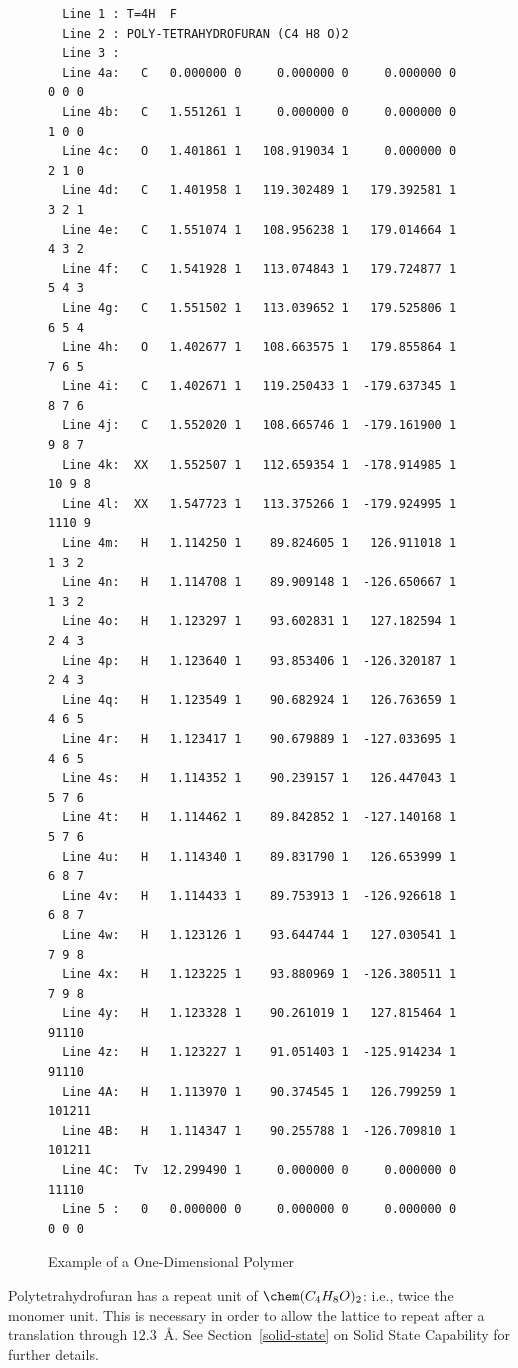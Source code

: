 \begin{figure}
\begin{makeimage}
\end{makeimage}
\compresstable
\begin{verbatim}
  Line 1 : T=4H  F
  Line 2 : POLY-TETRAHYDROFURAN (C4 H8 O)2
  Line 3 :
  Line 4a:   C   0.000000 0     0.000000 0     0.000000 0  0 0 0
  Line 4b:   C   1.551261 1     0.000000 0     0.000000 0  1 0 0
  Line 4c:   O   1.401861 1   108.919034 1     0.000000 0  2 1 0
  Line 4d:   C   1.401958 1   119.302489 1   179.392581 1  3 2 1
  Line 4e:   C   1.551074 1   108.956238 1   179.014664 1  4 3 2
  Line 4f:   C   1.541928 1   113.074843 1   179.724877 1  5 4 3
  Line 4g:   C   1.551502 1   113.039652 1   179.525806 1  6 5 4
  Line 4h:   O   1.402677 1   108.663575 1   179.855864 1  7 6 5
  Line 4i:   C   1.402671 1   119.250433 1  -179.637345 1  8 7 6
  Line 4j:   C   1.552020 1   108.665746 1  -179.161900 1  9 8 7
  Line 4k:  XX   1.552507 1   112.659354 1  -178.914985 1 10 9 8
  Line 4l:  XX   1.547723 1   113.375266 1  -179.924995 1 1110 9
  Line 4m:   H   1.114250 1    89.824605 1   126.911018 1  1 3 2
  Line 4n:   H   1.114708 1    89.909148 1  -126.650667 1  1 3 2
  Line 4o:   H   1.123297 1    93.602831 1   127.182594 1  2 4 3
  Line 4p:   H   1.123640 1    93.853406 1  -126.320187 1  2 4 3
  Line 4q:   H   1.123549 1    90.682924 1   126.763659 1  4 6 5
  Line 4r:   H   1.123417 1    90.679889 1  -127.033695 1  4 6 5
  Line 4s:   H   1.114352 1    90.239157 1   126.447043 1  5 7 6
  Line 4t:   H   1.114462 1    89.842852 1  -127.140168 1  5 7 6
  Line 4u:   H   1.114340 1    89.831790 1   126.653999 1  6 8 7
  Line 4v:   H   1.114433 1    89.753913 1  -126.926618 1  6 8 7
  Line 4w:   H   1.123126 1    93.644744 1   127.030541 1  7 9 8
  Line 4x:   H   1.123225 1    93.880969 1  -126.380511 1  7 9 8
  Line 4y:   H   1.123328 1    90.261019 1   127.815464 1  91110
  Line 4z:   H   1.123227 1    91.051403 1  -125.914234 1  91110
  Line 4A:   H   1.113970 1    90.374545 1   126.799259 1 101211
  Line 4B:   H   1.114347 1    90.255788 1  -126.709810 1 101211
  Line 4C:  Tv  12.299490 1     0.000000 0     0.000000 0  11110
  Line 5 :   0   0.000000 0     0.000000 0     0.000000 0  0 0 0
\end{verbatim}
\caption{\label{pthf}Example of a One-Dimensional Polymer}
\end{figure}

Polytetrahydrofuran has a repeat unit of $\chem (C_4H_8O)_2$: i.e., twice  the 
monomer  unit.   This is necessary in order to allow the lattice to repeat
after a translation through $12.3$~\AA.   See Section~\ref{solid-state} on
Solid State Capability for further details.

